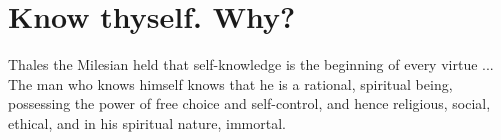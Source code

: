 \section{Know thyself. Why?}

\begin{quotex}
Thales the Milesian held that self-knowledge is the beginning of every virtue ... The man who knows himself knows that he is a rational, spiritual being, possessing the power of free choice and self-control, and hence religious, social, ethical, and in his spiritual nature, immortal.
\end{quotex}


